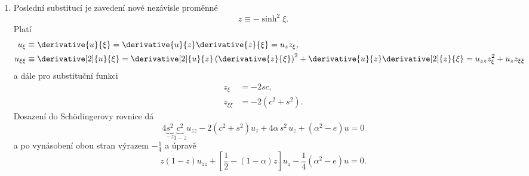 \begin{solution}
\begin{enumerate}
    \item
        Poslední substitucí je zavedení nové nezávisle proměnné
        \begin{equation}
            z\equiv-\sinh^{2}\xi.
        \end{equation}
        Platí
        \begin{subequations}
            \begin{align}
                u_{\xi}&\equiv\derivative{u}{\xi}=\derivative{u}{z}\derivative{z}{\xi}=u_{z}z_{\xi},\\
                u_{\xi\xi}&\equiv\derivative[2]{u}{\xi}=\derivative[2]{u}{z}\left(\derivative{z}{\xi}\right)^{2}+\derivative{u}{z}\derivative[2]{z}{\xi}=u_{zz}z_{\xi}^{2}+u_{z}z_{\xi\xi}
            \end{align}
        \end{subequations}
        a dále pro substituční funkci
        \begin{subequations}
            \begin{align}
                z_{\xi}&=-2sc,\\
                z_{\xi\xi}&=-2(c^{2}+s^{2}).
            \end{align}
        \end{subequations}
        Dosazení do Schödingerovy rovnice dá
        \begin{equation}
            4\underbrace{s^{2}}_{-z}\underbrace{c^{2}}_{1-z}u_{zz}-2\left(c^{2}+s^{2}\right)u_{z}+4\alpha\,s^{2}\,u_{z}+\left(\alpha^{2}-e\right)u=0
        \end{equation}
        a po vynásobení obou stran výrazem $-\frac{1}{4}$ a úpravě
        \begin{equation}
            \label{eq:PoschlTellerEquationFinal}
            z(1-z)u_{zz}+\left[\frac{1}{2}-(1-\alpha)z\right]u_{z}-\frac{1}{4}\left(\alpha^{2}-e\right)u=0.
        \end{equation}


\end{enumerate}
\end{solution}
